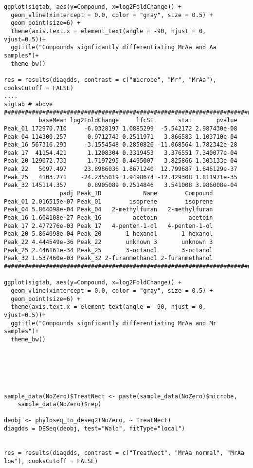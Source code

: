 \documentclass[]{article}
\begin{document}
\begin{verbatim}
ggplot(sigtab, aes(y=Compound, x=log2FoldChange)) + 
  geom_vline(xintercept = 0.0, color = "gray", size = 0.5) +
  geom_point(size=6) + 
  theme(axis.text.x = element_text(angle = -90, hjust = 0, vjust=0.5))+
  ggtitle("Compounds signficantly differentiating MrAa and Aa samples")+
  theme_bw()

res = results(diagdds, contrast = c("microbe", "Mr", "MrAa"), cooksCutoff = FALSE)
....
sigtab # above
################################################################################################
          baseMean log2FoldChange     lfcSE       stat       pvalue
Peak_01 172970.710     -6.0328197 1.0885299  -5.542172 2.987430e-08
Peak_04 114300.257      0.9712743 0.2511971   3.866583 1.103710e-04
Peak_16 567316.293     -3.1554548 0.2850826 -11.068564 1.782342e-28
Peak_17  41154.421      1.1208304 0.3319453   3.376551 7.340077e-04
Peak_20 129072.733      1.7197295 0.4495007   3.825866 1.303133e-04
Peak_22   5097.497     23.8986036 1.8671240  12.799687 1.646129e-37
Peak_25   4103.271    -24.2355019 1.9498674 -12.429308 1.811971e-35
Peak_32 145114.357      0.8905089 0.2514846   3.541008 3.986008e-04
                padj Peak_ID            Name        Compound
Peak_01 2.016515e-07 Peak_01        isoprene        isoprene
Peak_04 5.864098e-04 Peak_04   2-methylfuran   2-methylfuran
Peak_16 1.604108e-27 Peak_16         acetoin         acetoin
Peak_17 2.477276e-03 Peak_17   4-penten-1-ol   4-penten-1-ol
Peak_20 5.864098e-04 Peak_20       1-hexanol       1-hexanol
Peak_22 4.444549e-36 Peak_22       unknown 3       unknown 3
Peak_25 2.446161e-34 Peak_25       3-octanol       3-octanol
Peak_32 1.537460e-03 Peak_32 2-furanmethanol 2-furanmethanol
####################################################################################################

ggplot(sigtab, aes(y=Compound, x=log2FoldChange)) + 
  geom_vline(xintercept = 0.0, color = "gray", size = 0.5) +
  geom_point(size=6) + 
  theme(axis.text.x = element_text(angle = -90, hjust = 0, vjust=0.5))+
  ggtitle("Compounds signficantly differentiating MrAa and Mr samples")+
  theme_bw()






sample_data(NoZero)$TreatNect <- paste(sample_data(NoZero)$microbe, 
    sample_data(NoZero)$rep)

deobj <- phyloseq_to_deseq2(NoZero, ~ TreatNect)
diagdds = DESeq(deobj, test="Wald", fitType="local")


res = results(diagdds, contrast = c("TreatNect", "MrAa normal", "MrAa low"), cooksCutoff = FALSE)


\end{verbatim}
\end{document}
